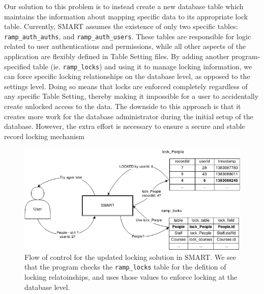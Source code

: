 \documentclass[12pt]{article}
\newcommand{\code}[1]{\texttt{#1}}
\begin{document}
Our solution to this problem is to instead create a new database table which maintains the information about mapping specific data to its appropriate lock table. Currently, SMART assumes the existence of only two specific tables: \code{ramp\_auth\_auths}, and \code{ramp\_auth\_users}. These tables are responsible for logic related to user authentications and permissions, while all other aspects of the application are flexibly defined in Table Setting files. By adding another program-specified table (ie. \code{ramp\_locks}) and using it to manage locking information, we can force specific locking relationships on the database level, as opposed to the settings level. Doing so means that locks are enforced completely regardless of any specific Table Setting, thereby making it impossible for a user to accidentally create unlocked access to the data. The downside to this approach is that it creates more work for the database administrator during the initial setup of the database. However, the extra effort is necessary to ensure a secure and stable record locking mechanism

\begin{center}
\begin{figure}[h]
    \centering
    \centerline{\includegraphics[width=7in]{diagrams/SecondLockDesign.png}}
    \begin{spacing}{1.0}\caption{Flow of control for the updated locking solution in SMART. We see that the program checks the \code{ramp\_locks} table for the defition of locking relatoinships, and uses those values to enforce locking at the database level.}\end{spacing}
\end{figure}
\end{center}
\end{document}
